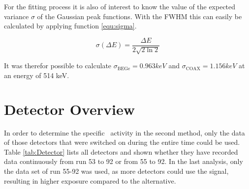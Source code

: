 For the fitting process it is also of interest to know the value of the expected variance $\sigma$ of the Gaussian peak functions.
With the FWHM this can easily be calculated by applying function \ref{equ:sigma}.

\begin{equation}
\sigma (\Delta E) = \frac{\Delta E}{2\sqrt{2\ln2}}
\label{equ:sigma}
\end{equation}

It was therefor possible to calculate $\sigma_{\mathrm{BEGe}} = 0.963\unit{keV}$ and $\sigma_{\mathrm{COAX}} = 1.156\unit{keV}$ at an energy of 514 keV.


\chapter{Detector Overview}

In order to determine the specific \Kr\ activity in the second method, only the data of those detectors that were switched on during the entire time could be used.
Table \ref{tab:Detector} lists all detectors and shown whether they have recorded data continuously from run 53 to 92 or from 55 to 92.
In the last analysis, only the data set of run 55-92 was used, as more detectors could use the signal, resulting in higher exposure compared to the alternative.

